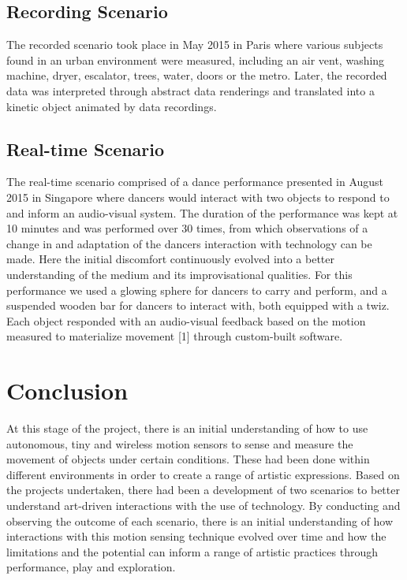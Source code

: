 \documentclass{sigchi}
\begin{document}
\subsection{Recording Scenario}
The recorded scenario took place in May 2015 in Paris
where various subjects found in an urban environment
were measured, including an air vent, washing
machine, dryer, escalator, trees, water, doors or the
metro. Later, the recorded data was interpreted
through abstract data renderings and translated into a
kinetic object animated by data recordings.

\subsection{Real-time Scenario}
The real-time scenario comprised of a dance
performance presented in August 2015 in Singapore
where dancers would interact with two objects to
respond to and inform an audio-visual system. The
duration of the performance was kept at 10 minutes
and was performed over 30 times, from which
observations of a change in and adaptation of the
dancers interaction with technology can be made. Here
the initial discomfort continuously evolved into a better
understanding of the medium and its improvisational
qualities. For this performance we used a glowing
sphere for dancers to carry and perform, and a
suspended wooden bar for dancers to interact with,
both equipped with a twiz. Each object responded with
an audio-visual feedback based on the motion
measured to materialize movement [1] through
custom-built software.

\section{Conclusion}

At this stage of the project, there is an initial
understanding of how to use autonomous, tiny and
wireless motion sensors to sense and measure the
movement of objects under certain conditions. These
had been done within different environments in order to
create a range of artistic expressions. Based on the
projects undertaken, there had been a development of
two scenarios to better understand art-driven
interactions with the use of technology.
By conducting and observing the outcome of each
scenario, there is an initial understanding of how
interactions with this motion sensing technique evolved
over time and how the limitations and the potential can
inform a range of artistic practices through
performance, play and exploration.
\end{document}
